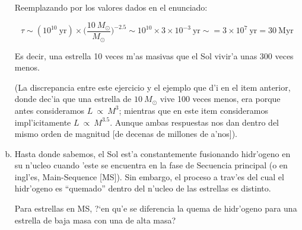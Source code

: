\documentclass{article}
\begin{document}
\begin{enumerate}[a)]
Reemplazando por los valores dados en el enunciado:

\begin{equation*}
\tau \sim (10^{10} \ \text{yr}) \times \bigg( \frac{10 \ M_\odot}{M_\odot} \bigg)^{-2.5} \sim  10^{10}  \times 3 \times 10^{-3} \ \text{yr} \sim = 3 \times 10^{7} \ \text{yr} = 30 \ \text{Myr}
\end{equation*}

Es decir, una estrella 10 veces m'as masivas que el Sol vivir'a unas 300 veces menos.

(La discrepancia entre este ejercicio y el ejemplo que d'i en el item anterior, donde dec'ia que una estrella de $10 \ M_\odot$ vive 100 veces menos, era porque antes consideramos 
$L \ \propto \ M^{3}$; mientras que en este item consideramos impl'icitamente $L \ \propto \ M^{3.5}$. Aunque ambas respuestas nos dan dentro del mismo orden de magnitud [de decenas de millones de a'nos]).
\item Hasta donde sabemos, el Sol est'a constantemente fusionando hidr'ogeno en su n'ucleo cuando 'este se encuentra en la fase de Secuencia principal (o en ingl'es, Main-Sequence [MS]). Sin embargo, el proceso a trav'es del cual el hidr'ogeno es ``quemado'' dentro del n'ucleo de las estrellas es distinto. 

Para estrellas en MS, ?`en qu'e se diferencia la quema de hidr'ogeno para una estrella de baja masa con una de alta masa?

\newpage


\end{enumerate}
\end{document}
